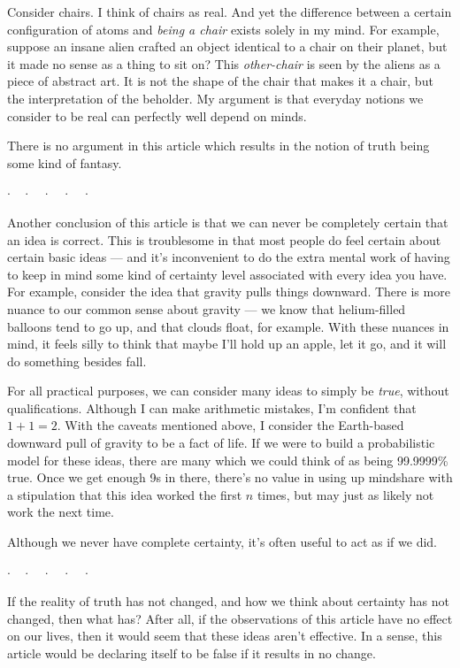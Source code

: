 \documentclass[11pt, oneside]{article}   	%
\newcommand{\dotq}{\cdot\quad}
\newcommand{\scenebreak}{
    \medskip\centerline{$\dotq\dotq\dotq\dotq\cdot$}\medskip
}
\begin{document}
Consider chairs. I think of chairs as real. And yet the difference between a
certain configuration of atoms and {\em being a chair} exists solely in my mind.
For example, suppose an insane alien crafted an object identical to a chair on
their planet, but it made no sense as a thing to sit on? This {\em other-chair}
is seen by the aliens as a piece of abstract art. It is not the shape of the
chair that makes it a chair, but the interpretation of the beholder.
My argument is that everyday notions we consider to be real can perfectly well
depend on minds.

There is no argument in this article which results in the notion of truth being
some kind of fantasy.

\scenebreak

Another conclusion of this article is that we can never be completely certain
that an idea is correct.
This is troublesome in that most people do feel certain about certain basic
ideas --- and it's inconvenient to do the extra mental work of having to keep in
mind some kind of certainty level associated with every idea you have.
For example, consider the idea that gravity pulls things downward.
There is more nuance to our common sense about gravity --- we know that
helium-filled balloons tend to go up, and that clouds float, for example.
With these nuances in mind, it feels silly to think that maybe I'll hold up an
apple, let it go, and it will do something besides fall.

For all practical purposes, we can consider many ideas to simply be {\em true},
without qualifications. Although I can make arithmetic mistakes, I'm confident
that $1+1=2$. With the caveats mentioned above, I consider the Earth-based
downward pull of gravity to be a fact of life. If we were to build a
probabilistic model for these ideas, there are many which we could think of as
being 99.9999\% true. Once we get enough 9s in there,
there's no value in using up mindshare with a stipulation that this idea worked
the first $n$ times, but may just as likely not work the next time.

Although we never have complete certainty, it's often useful to act as
if we did.

\scenebreak

If the reality of truth has not changed, and how we think about certainty has
not changed, then what has? After all, if the observations of this
article have no effect on our lives, then it would seem that these ideas aren't
effective. In a sense, this article would be declaring itself to be false if
it results in no change.
\end{document}
